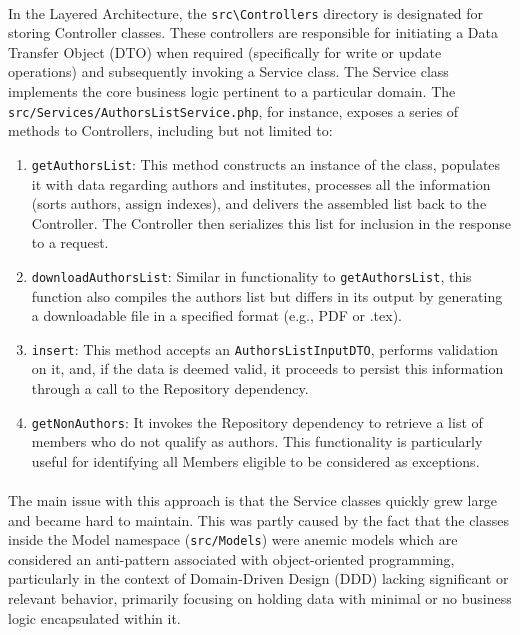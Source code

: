 \paragraph{} In the Layered Architecture, the \verb|src\Controllers| directory is designated for storing Controller classes. These controllers are responsible for initiating a Data Transfer Object (DTO) when required (specifically for write or update operations) and subsequently invoking a Service class. The Service class implements the core business logic pertinent to a particular domain. The \texttt{src/Services/AuthorsList\-Service.php}, for instance, exposes a series of methods to Controllers, including but not limited to:
\begin{enumerate}
    \item \verb |getAuthorsList|: This method constructs an instance of the  class, populates it with data regarding authors and institutes, processes all the information (sorts authors, assign indexes), and delivers the assembled list back to the Controller. The Controller then serializes this list for inclusion in the response to a request.
    \item \verb|downloadAuthorsList|: Similar in functionality to \verb|getAuthorsList|, this function also compiles the authors list but differs in its output by generating a downloadable file in a specified format (e.g., PDF or .tex).
    \item \verb|insert|: This method accepts an \verb|AuthorsListInputDTO|, performs validation on it, and, if the data is deemed valid, it proceeds to persist this information through a call to the Repository dependency.
    \item \verb|getNonAuthors|: It invokes the Repository dependency to retrieve a list of members who do not qualify as authors. This functionality is particularly useful for identifying all Members eligible to be considered as exceptions.
\end{enumerate}

\paragraph{} The main issue with this approach is that the Service classes quickly grew large and became hard to maintain. This was partly caused by the fact that the classes inside the Model namespace (\verb|src/Models|) were anemic models which are considered an anti-pattern associated with object-oriented programming, particularly in the context of Domain-Driven Design (DDD) lacking significant or relevant behavior, primarily focusing on holding data with minimal or no business logic encapsulated within it.


